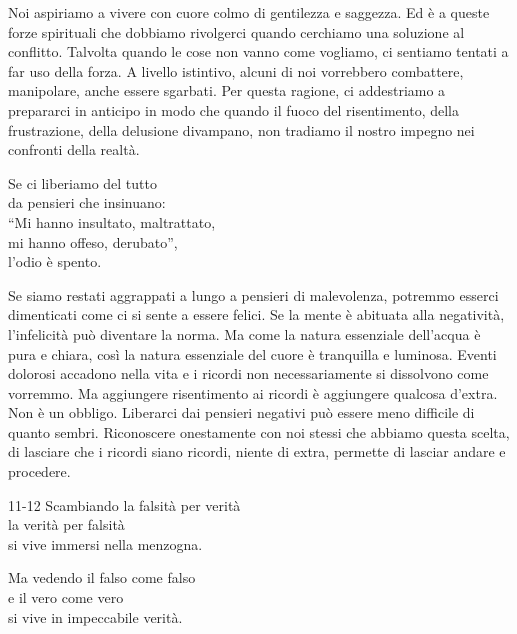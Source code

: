 \begin{dhpRefl}
Noi aspiriamo a vivere con cuore colmo di gentilezza e saggezza. Ed \`{e} a queste forze spirituali che dobbiamo rivolgerci quando cerchiamo una soluzione al conflitto. Talvolta quando le cose non vanno come vogliamo, ci sentiamo tentati a far uso della forza. A livello istintivo, alcuni di noi vorrebbero combattere, manipolare, anche essere sgarbati. Per questa ragione, ci addestriamo a prepararci in anticipo in modo che quando il fuoco del risentimento, della frustrazione, della delusione divampano, non tradiamo il nostro impegno nei confronti della realt\`{a}.
\end{dhpRefl}


\begin{dhpVerse}{4}
\label{dhp-4}
Se ci liberiamo del tutto\\
da pensieri che insinuano:\\
``Mi hanno insultato, maltrattato,\\
mi hanno offeso, derubato'',\\
l'odio \`{e} spento.
\end{dhpVerse}

\begin{dhpRefl}
Se siamo restati aggrappati a lungo a pensieri di malevolenza, potremmo esserci dimenticati come ci si sente a essere felici. Se la mente \`{e} abituata alla negativit\`{a}, l'infelicit\`{a} pu\`{o} diventare la norma. Ma come la natura essenziale dell'acqua \`{e} pura e chiara, così la natura essenziale del cuore \`{e} tranquilla e luminosa. Eventi dolorosi accadono nella vita e i ricordi non necessariamente si dissolvono come vorremmo. Ma aggiungere risentimento ai ricordi \`{e} aggiungere qualcosa d'extra. Non \`{e} un obbligo. Liberarci dai pensieri negativi pu\`{o} essere meno difficile di quanto sembri. Riconoscere onestamente con noi stessi che abbiamo questa scelta, di lasciare che i ricordi siano ricordi, niente di extra, permette di lasciar andare e procedere.
\end{dhpRefl}


\begin{dhpVerse}{11-12}
\label{dhp-11}\label{dhp-12}
Scambiando la falsit\`{a} per verit\`{a}\\
la verit\`{a} per falsit\`{a}\\
si vive immersi nella menzogna.

Ma vedendo il falso come falso\\
e il vero come vero\\
si vive in impeccabile verit\`{a}.
\end{dhpVerse}

